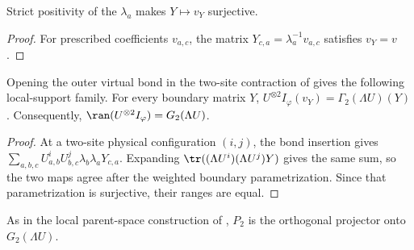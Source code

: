 \begin{lemma}
    \label{thm:appendixB_weighted_two_site_boundary_surjective}
    \leanok
    Strict positivity of the $\lambda_a$ makes $Y\mapsto v_Y$ surjective.
\end{lemma}

\begin{proof}
    \leanok
    For prescribed coefficients $v_{a,c}$, the matrix
    $Y_{c,a}=\lambda_a^{-1}v_{a,c}$ satisfies $v_Y=v$.
\end{proof}

\begin{lemma}
    \label{thm:appendixB_two_site_basic_embedding_range}
    \leanok
    Opening the outer virtual bond in the two-site contraction of
    \cite[Equations~(3.17)--(3.18)]{Cirac2016MPDO_arXiv} gives the following
    local-support family. For every boundary matrix $Y$,
    $U^{\otimes2}I_\varphi(v_Y) = \Gamma_2(\Lambda U)(Y)$.
    Consequently, $\ran(U^{\otimes2}I_\varphi)=G_2(\Lambda U)$.
\end{lemma}

\begin{proof}
    \leanok
    At a two-site physical configuration $(i,j)$, the bond insertion gives
    $\sum_{a,b,c}U^i_{a,b}U^j_{b,c}\lambda_b\lambda_aY_{c,a}$.
    Expanding $\tr((\Lambda U^i)(\Lambda U^j)Y)$ gives the same sum, so
    the two maps agree after the weighted boundary parametrization. Since that
    parametrization is surjective, their ranges are equal.
\end{proof}

\begin{definition}
    \label{def:appendixB_two_site_basic_support_projector}
    \leanok
    As in the local parent-space construction of
    \cite[Definition~3.9]{Cirac2016MPDO_arXiv}, $P_2$ is the orthogonal
    projector onto $G_2(\Lambda U)$.
\end{definition}


